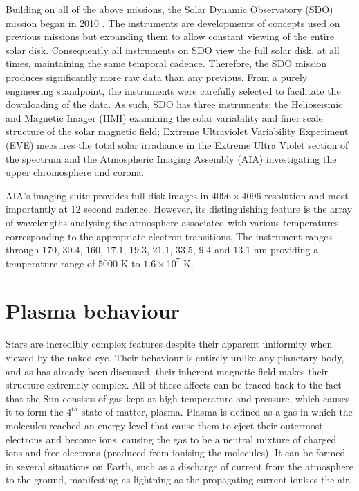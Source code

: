 Building on all of the above missions, the Solar Dynamic Observatory (SDO) mission began in 2010 \cite{Kaiser2008}.
The instruments are developments of concepts used on previous missions but expanding them to allow constant viewing of the entire solar disk.
Consequently all instruments on SDO view the full solar disk, at all times, maintaining the same temporal cadence. 
Therefore, the SDO mission produces significantly more raw data than any previous.
From a purely engineering standpoint, the instruments were carefully selected to facilitate the downloading of the data.
As such, SDO has three instruments; the Helioseismic and Magnetic Imager (HMI) examining the solar variability and finer scale structure of the solar magnetic field; Extreme Ultraviolet Variability Experiment (EVE) measures the total solar irradiance in the Extreme Ultra Violet section of the spectrum and the Atmospheric Imaging Assembly (AIA) investigating the upper chromosphere and corona.

AIA's imaging suite provides full disk images in $4096 \times 4096$ resolution and most importantly at $12$ second cadence.
However, its distinguishing feature is the array of wavelengths analysing the atmosphere \cite{AIAspec} associated with various temperatures corresponding to the appropriate electron transitions.
The instrument ranges through $170$, $30.4$, $160$, $17.1$, $19.3$, $21.1$, $33.5$, $9.4$ and $13.1$ nm providing a temperature range of $5000$ K to $1.6 \times 10^7$ K.




\section{Plasma behaviour}

Stars are incredibly complex features despite their apparent uniformity when viewed by the naked eye.
Their behaviour is entirely unlike any planetary body, and as has already been discussed, their inherent magnetic field makes their structure extremely complex.
All of these affects can be traced back to the fact that the Sun consists of gas kept at high temperature and pressure, which causes it to form the $4^{th}$ state of matter, plasma.
Plasma is defined as a gas in which the molecules reached an energy level that cause them to eject their outermost electrons and become ions, causing the gas to be a neutral mixture of charged ions and free electrons (produced from ionising the molecules).
It can be formed in several situations on Earth, such as a discharge of current from the atmosphere to the ground, manifesting as lightning as the propagating current ionises the air.

